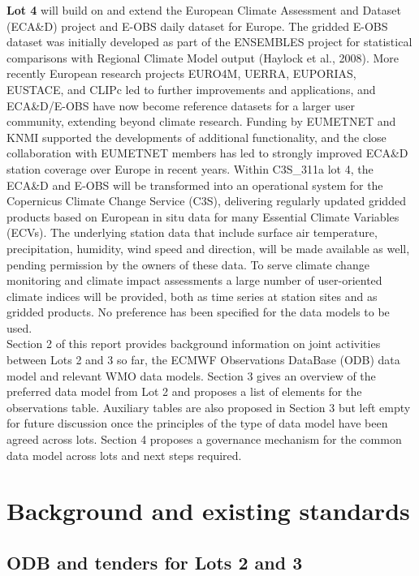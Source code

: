 \documentclass[a4paper]{article}
\begin{document}
\textbf{Lot 4} will build on and extend the European Climate Assessment and Dataset (ECA\&D) project and E-OBS daily dataset for Europe. The gridded E-OBS dataset was initially developed as part of the ENSEMBLES project for statistical comparisons with Regional Climate Model output (Haylock et al., 2008). More recently European research projects EURO4M, UERRA, EUPORIAS, EUSTACE, and CLIPc led to further improvements and applications, and ECA\&D/E-OBS have now become reference datasets for a larger user community, extending beyond climate research. Funding by EUMETNET and KNMI supported the developments of additional functionality, and the close collaboration with EUMETNET members has led to strongly improved ECA\&D station coverage over Europe in recent years. Within C3S\_311a lot 4, the ECA\&D and E-OBS will be transformed into an operational system for the Copernicus Climate Change Service (C3S), delivering regularly updated gridded products based on European in situ data for many Essential Climate Variables (ECVs). The underlying station data that include surface air temperature, precipitation, humidity, wind speed and direction, will be made available as well, pending permission by the owners of these data. To serve climate change monitoring and climate impact assessments a large number of user-oriented climate indices will be provided, both as time series at station sites and as gridded products. No preference has been specified for the data models to be used.\\


Section 2 of this report provides background information on joint activities between Lots 2 and 3 so far, the ECMWF Observations DataBase (ODB) data model and relevant WMO data models. Section 3 gives an overview of the preferred data model from Lot 2 and proposes a list of elements for the observations table. Auxiliary tables are also proposed in Section 3 but left empty for future discussion once the principles of the type of data model have been agreed across lots. Section 4 proposes a governance mechanism for the common data model across lots and next steps required.\\


\section {Background and existing standards}
\subsection {ODB and tenders for Lots 2 and 3}
\end{document}
